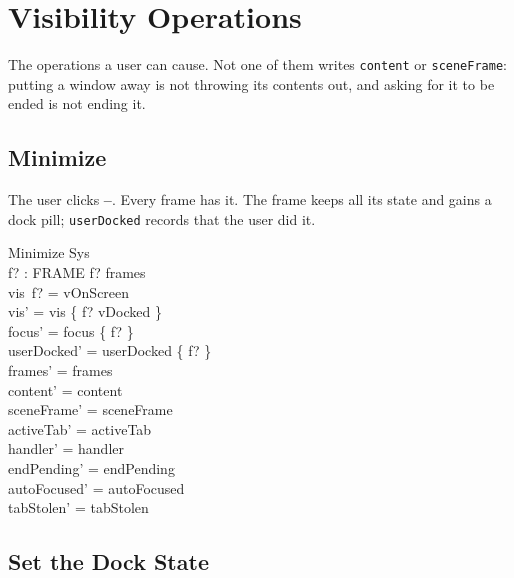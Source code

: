 \documentclass[a4paper,10pt,fleqn]{article}
\begin{document}
\section{Visibility Operations}

The operations a user can cause.  Not one of them writes \texttt{content} or
\texttt{sceneFrame}: putting a window away is not throwing its contents out,
and asking for it to be ended is not ending it.

\subsection{Minimize}

The user clicks \textbf{--}.  Every frame has it.  The frame keeps all its
state and gains a dock pill; \texttt{userDocked} records that the user did it.

\begin{schema}{Minimize}
  \Delta Sys \\
  f? : FRAME
\where
  f? \in frames \\
  vis~f? = vOnScreen \\
  vis' = vis \oplus \{ f? \mapsto vDocked \} \\
  focus' = focus \setminus \{ f? \} \\
  userDocked' = userDocked \cup \{ f? \} \\
  frames' = frames \\
  content' = content \\
  sceneFrame' = sceneFrame \\
  activeTab' = activeTab \\
  handler' = handler \\
  endPending' = endPending \\
  autoFocused' = autoFocused \\
  tabStolen' = tabStolen
\end{schema}

\subsection{Set the Dock State}
\end{document}
